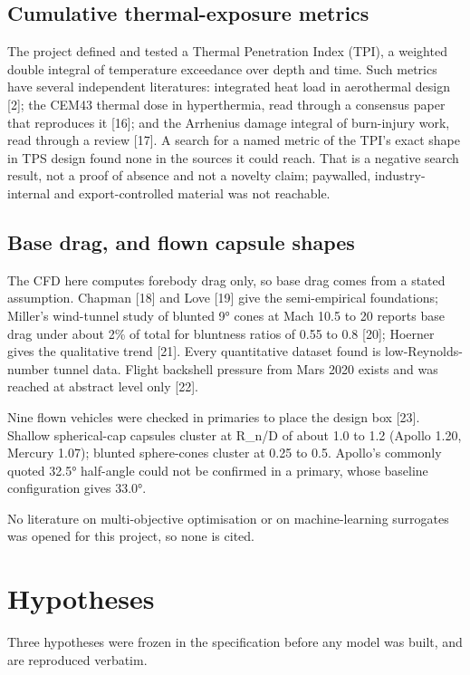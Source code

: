 \documentclass[
  a4paper,
  11pt]{article}
\begin{document}
\subsection{Cumulative thermal-exposure metrics}

The project defined and tested a Thermal Penetration Index (TPI), a
weighted double integral of temperature exceedance over depth and time.
Such metrics have several independent literatures: integrated heat load
in aerothermal design {[}2{]}; the CEM43 thermal dose in hyperthermia,
read through a consensus paper that reproduces it {[}16{]}; and the
Arrhenius damage integral of burn-injury work, read through a review
{[}17{]}. A search for a named metric of the TPI's exact shape in TPS
design found none in the sources it could reach. That is a negative
search result, not a proof of absence and not a novelty claim;
paywalled, industry-internal and export-controlled material was not
reachable.

\subsection{Base drag, and flown capsule shapes}

The CFD here computes forebody drag only, so base drag comes from a
stated assumption. Chapman {[}18{]} and Love {[}19{]} give the
semi-empirical foundations; Miller's wind-tunnel study of blunted 9°
cones at Mach 10.5 to 20 reports base drag under about 2\% of total for
bluntness ratios of 0.55 to 0.8 {[}20{]}; Hoerner gives the qualitative
trend {[}21{]}. Every quantitative dataset found is low-Reynolds-number
tunnel data. Flight backshell pressure from Mars 2020 exists and was
reached at abstract level only {[}22{]}.

Nine flown vehicles were checked in primaries to place the design box
{[}23{]}. Shallow spherical-cap capsules cluster at R\_n/D of about 1.0
to 1.2 (Apollo 1.20, Mercury 1.07); blunted sphere-cones cluster at 0.25
to 0.5. Apollo's commonly quoted 32.5° half-angle could not be confirmed
in a primary, whose baseline configuration gives 33.0°.

No literature on multi-objective optimisation or on machine-learning
surrogates was opened for this project, so none is cited.

\section{Hypotheses}

Three hypotheses were frozen in the specification before any model was
built, and are reproduced verbatim.
\end{document}
